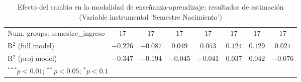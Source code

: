 \begin{table}
\begin{center}
\begin{tabular}{l c c c c c c c}
Num. groups: semestre\_ingreso                      & $17$      & $17$      & $17$         & $17$         & $17$         & $17$         & $17$        \\
R$^2$ (full model)                                  & $-0.226$  & $-0.087$  & $0.049$      & $0.053$      & $0.124$      & $0.129$      & $0.021$     \\
R$^2$ (proj model)                                  & $-0.347$  & $-0.194$  & $-0.045$     & $-0.041$     & $0.037$      & $0.042$      & $-0.076$    \\
\hline
\multicolumn{8}{l}{\scriptsize{$^{***}p<0.01$; $^{**}p<0.05$; $^{*}p<0.1$}}
\end{tabular}
\caption{Efecto del cambio en la modalidad de enseñanza-aprendizaje: resultados de estimación (Variable instrumental 'Semestre Nacimiento')}
\label{tab:regresiones_efectos_fijos_IV}
\end{center}
\end{table}
